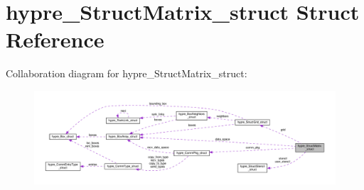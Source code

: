 \hypertarget{structhypre__StructMatrix__struct}{}\section{hypre\+\_\+\+Struct\+Matrix\+\_\+struct Struct Reference}
\label{structhypre__StructMatrix__struct}


Collaboration diagram for hypre\+\_\+\+Struct\+Matrix\+\_\+struct\+:
\nopagebreak
\begin{figure}[H]
\begin{center}
\leavevmode
\includegraphics[width=350pt]{structhypre__StructMatrix__struct__coll__graph}
\end{center}
\end{figure}
